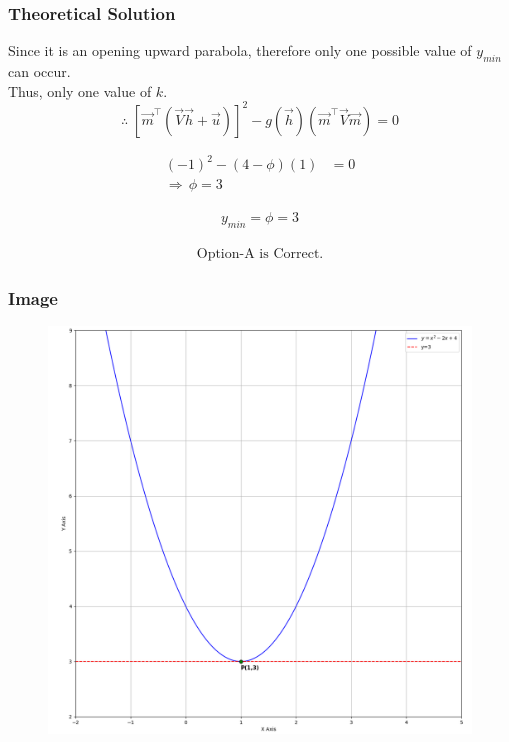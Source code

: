\documentclass{beamer}
\begin{document}
\begin{frame}[fragile]
\frametitle{Theoretical Solution}
Since it is an opening upward parabola, therefore only one possible value of $y_{min}$ can occur.\\
Thus, only one value of $k$.
\begin{equation}
    \therefore \; [\vec{m}^\top(\vec{V}\vec{h}+\vec{u})]^2 - g(\vec{h})(\vec{m}^\top\vec{V}\vec{m}) = 0
\end{equation}

\begin{align}
    (-1)^2 - (4-\phi)(1) &= 0 \\
  \Rightarrow \, \boxed{\phi = 3}
\end{align}

\begin{align}
y_{min} = \phi = 3    
\end{align}

\begin{align*}
    \boxed{\text{Option-A is Correct.}}
\end{align*}
\end{frame}

\begin{frame}[fragile]
\frametitle{Image}
\begin{figure}
   \centering
    \includegraphics[width=\columnwidth, height=0.8\textheight, keepaspectratio]{figs/fig1.png}
    \label{fig:Beamer/figs/fig1.png}
\end{figure}
\end{frame}
\end{document}
